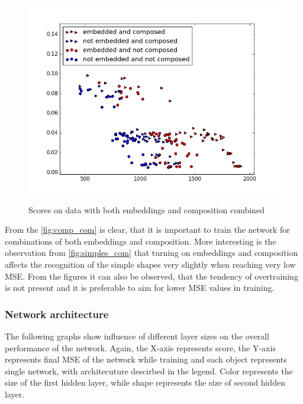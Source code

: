 \begin{figure}[!htb]
\begin{center}
\label{fig:x_com}
\includegraphics[width=\linewidth]{ext/figure_x_com.png}
\end{center}
	\centering
	\caption{Scores on data with both embeddings and composition combined}
\end{figure}

From the \ref{fig:comp_com} is clear, that it is important to train the network for combinations of both embeddings and composition. More interesting is the observation from \ref{fig:simples_com} that turning on embeddings and composition affects the recognition of the simple shapes very slightly when reaching very low MSE. From the figures it can also be observed, that the tendency of overtraining is not present and it is preferable to aim for lower MSE values in training.

\subsubsection{Network architecture}
The following graphs show influence of different layer sizes on the overall performance of the network. Again, the X-axis represents score, the Y-axis represents final MSE of the network while training and each object represents single network, with architecuture descirbed in the legend. Color represents the size of the first hidden layer, while shape represents the size of second hidden layer.

